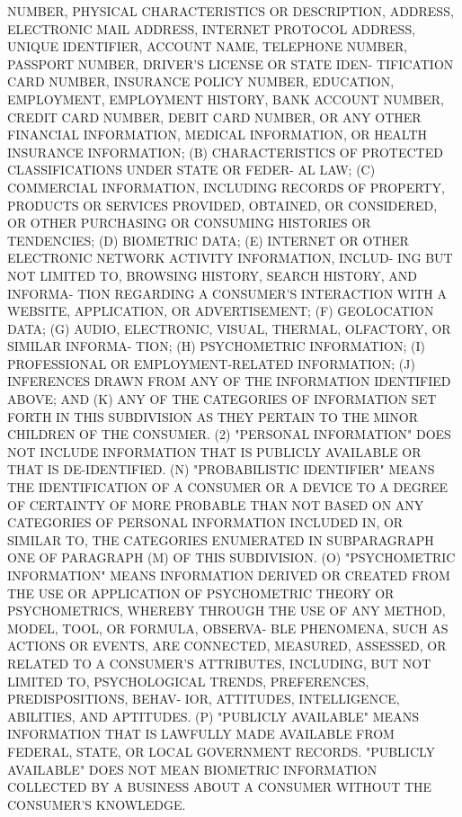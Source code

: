  NUMBER, PHYSICAL CHARACTERISTICS  OR  DESCRIPTION,  ADDRESS,  ELECTRONIC
 MAIL  ADDRESS,  INTERNET  PROTOCOL  ADDRESS,  UNIQUE IDENTIFIER, ACCOUNT
 NAME, TELEPHONE NUMBER, PASSPORT NUMBER, DRIVER'S LICENSE OR STATE IDEN-
 TIFICATION  CARD NUMBER, INSURANCE POLICY NUMBER, EDUCATION, EMPLOYMENT,
 EMPLOYMENT HISTORY, BANK ACCOUNT NUMBER, CREDIT CARD NUMBER, DEBIT  CARD
 NUMBER,  OR  ANY  OTHER  FINANCIAL  INFORMATION, MEDICAL INFORMATION, OR
 HEALTH INSURANCE INFORMATION;
   (B) CHARACTERISTICS OF PROTECTED CLASSIFICATIONS UNDER STATE OR FEDER-
 AL LAW;
   (C) COMMERCIAL INFORMATION, INCLUDING RECORDS OF PROPERTY, PRODUCTS OR
 SERVICES PROVIDED, OBTAINED,  OR  CONSIDERED,  OR  OTHER  PURCHASING  OR
 CONSUMING HISTORIES OR TENDENCIES;
   (D) BIOMETRIC DATA;
   (E) INTERNET OR OTHER ELECTRONIC NETWORK ACTIVITY INFORMATION, INCLUD-
 ING  BUT  NOT LIMITED TO, BROWSING HISTORY, SEARCH HISTORY, AND INFORMA-
 TION REGARDING A CONSUMER'S INTERACTION WITH A WEBSITE, APPLICATION,  OR
 ADVERTISEMENT;
   (F) GEOLOCATION DATA;
   (G) AUDIO, ELECTRONIC, VISUAL, THERMAL, OLFACTORY, OR SIMILAR INFORMA-
 TION;
   (H) PSYCHOMETRIC INFORMATION;
   (I) PROFESSIONAL OR EMPLOYMENT-RELATED INFORMATION;
   (J) INFERENCES DRAWN FROM ANY OF THE INFORMATION IDENTIFIED ABOVE; AND
   (K) ANY OF THE CATEGORIES OF INFORMATION SET FORTH IN THIS SUBDIVISION
 AS THEY PERTAIN TO THE MINOR CHILDREN OF THE CONSUMER.
   (2)  "PERSONAL  INFORMATION"  DOES  NOT  INCLUDE  INFORMATION  THAT IS
 PUBLICLY AVAILABLE OR THAT IS DE-IDENTIFIED.
   (N) "PROBABILISTIC IDENTIFIER" MEANS THE IDENTIFICATION OF A  CONSUMER
 OR  A DEVICE TO A DEGREE OF CERTAINTY OF MORE PROBABLE THAN NOT BASED ON
 ANY CATEGORIES OF PERSONAL INFORMATION INCLUDED IN, OR SIMILAR  TO,  THE
 CATEGORIES  ENUMERATED  IN  SUBPARAGRAPH  ONE  OF  PARAGRAPH (M) OF THIS
 SUBDIVISION.
   (O) "PSYCHOMETRIC INFORMATION" MEANS INFORMATION  DERIVED  OR  CREATED
 FROM  THE  USE  OR  APPLICATION OF PSYCHOMETRIC THEORY OR PSYCHOMETRICS,
 WHEREBY THROUGH THE USE OF ANY METHOD, MODEL, TOOL, OR FORMULA, OBSERVA-
 BLE PHENOMENA, SUCH AS  ACTIONS  OR  EVENTS,  ARE  CONNECTED,  MEASURED,
 ASSESSED,  OR  RELATED  TO  A  CONSUMER'S ATTRIBUTES, INCLUDING, BUT NOT
 LIMITED TO, PSYCHOLOGICAL TRENDS, PREFERENCES,  PREDISPOSITIONS,  BEHAV-
 IOR, ATTITUDES, INTELLIGENCE, ABILITIES, AND APTITUDES.
   (P)  "PUBLICLY  AVAILABLE"  MEANS  INFORMATION  THAT  IS LAWFULLY MADE
 AVAILABLE FROM FEDERAL, STATE, OR LOCAL GOVERNMENT RECORDS.    "PUBLICLY
 AVAILABLE"  DOES  NOT MEAN BIOMETRIC INFORMATION COLLECTED BY A BUSINESS
 ABOUT A CONSUMER WITHOUT THE CONSUMER'S KNOWLEDGE.
